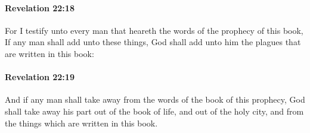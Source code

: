 		\paragraph{Revelation 22:18} %
			\label{REVELATIONNT-22-18}

			For I testify unto every man that heareth the words of the prophecy of this book, If any man shall add unto these things, God shall add unto him the plagues that are written in this book:

			\begin{framed}
			\scriptsize
				\begin{compactdesc}
					\item[SBLG] 
				\end{compactdesc}
			\end{framed}

		\paragraph{Revelation 22:19} %
			\label{REVELATIONNT-22-19}

			And if any man shall take away from the words of the book of this prophecy, God shall take away his part out of the book of life, and out of the holy city, and from the things which are written in this book.

